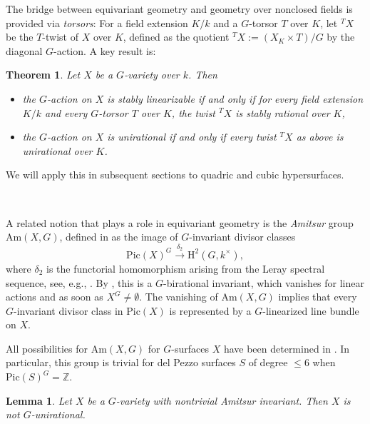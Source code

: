 \documentclass[12pt,reqno]{amsart}
\theoremstyle{plain}
\newtheorem{theo}[prop]{Theorem}
\newtheorem{lemm}[prop]{Lemma}
\theoremstyle{remark}
\theoremstyle{definition}
\numberwithin{equation}{section}
\def\bZ{{\mathbb Z}}
\def\rH{{\mathrm H}}
\def\Pic{\mathrm{Pic}}
\begin{document}
The bridge between equivariant geometry and geometry over nonclosed fields is provided via {\em torsors}: For a field extension  
$K/k$ and a $G$-torsor $T$ over $K$, let 
${}^TX$ be the $T$-twist of $X$ over $K$, defined as the quotient ${}^TX:=(X_K\times T)/G$ by the diagonal $G$-action. A key result is:  


\begin{theo} \cite[Theorem 1.1]{DR}
\label{thm:bridge}
Let $X$ be a $G$-variety over $k$. Then
\begin{itemize}
    \item the $G$-action on $X$ is stably linearizable if and only if for every field extension $K/k$ and every $G$-torsor $T$ over $K$, the twist ${}^TX$ is stably rational over $K$, 
    \item  the $G$-action on $X$ is unirational if and only if every twist ${}^TX$ as above is unirational over $K$. 
\end{itemize}
\end{theo}
We will apply this in subsequent sections to quadric and cubic hypersurfaces. 

\ 



A related notion that plays a role in equivariant geometry is 
the {\em Amitsur} group $\mathrm{Am}(X,G)$, defined in \cite[Section 6]{BC-finite} as the image of $G$-invariant divisor classes 
$$
\Pic(X)^G\stackrel{\delta_2}{\longrightarrow} \rH^2(G,k^\times), 
$$
where $\delta_2$ is the functorial homomorphism arising from the Leray spectral sequence, see, e.g., \cite[Section 3]{KT-dp}.
By \cite[Theorem 6.1]{BC-finite}, this is a $G$-birational invariant, which vanishes for linear actions and as soon  as $X^G\neq \emptyset$.
The vanishing of $\mathrm{Am}(X,G)$ implies that every $G$-invariant divisor class in $\Pic(X)$ is represented by a $G$-linearized line bundle on $X$. 

All possibilities for $\mathrm{Am}(X,G)$ for $G$-surfaces $X$ have been determined in \cite[Proposition 6.7]{BC-finite}. In particular, this group is trivial for del Pezzo surfaces $S$ of degree $\le 6$ when $\Pic(S)^G=\bZ$. 


\begin{lemm}
\label{lem.Amitsurobstructs}
Let $X$ be a $G$-variety with nontrivial Amitsur invariant. Then 
$X$ is not $G$-unirational. 
\end{lemm}
\end{document}
